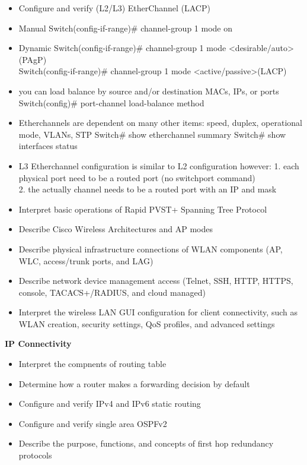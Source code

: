 \documentclass{article}
\begin{document}
\begin{itemize}
  \item Configure and verify (L2/L3) EtherChannel (LACP)
	\item[] Manual
		Switch(config-if-range)\# channel-group 1 mode on
	\item[] Dynamic
		Switch(config-if-range)\# channel-group 1 mode \textless desirable/auto\textgreater (PAgP)\\
		Switch(config-if-range)\# channel-group 1 mode \textless active/passive\textgreater (LACP)
	\item[] you can load balance by source and/or destination MACs, IPs, or ports
		Switch(config)\# port-channel load-balance method 
	\item[] Etherchannels are dependent on many other items: speed, duplex, operational mode, VLANs, STP
		Switch\# show etherchannel summary
		Switch\# show interfaces status
	\item[] L3 Etherchannel configuration is similar to L2 configuration however:
		1. each physical port need to be a routed port (no switchport command)\\
		2. the actually channel needs to be a routed port with an IP and mask\\
  \item Interpret basic operations of Rapid PVST+ Spanning Tree Protocol
  \item Describe Cisco Wireless Architectures and AP modes
  \item Describe physical infrastructure connections of WLAN components (AP, WLC, access/trunk ports, and LAG)
  \item Describe network device management access (Telnet, SSH, HTTP, HTTPS, console, TACACS+/RADIUS, and cloud managed)
  \item Interpret the wireless LAN GUI configuration for client connectivity, such as WLAN creation, security settings, QoS profiles, and advanced settings\\
\end{itemize}



\begin{flushleft}\textbf{IP Connectivity}\end{flushleft}
\begin{itemize}
  \item Interpret the compnents of routing table
  \item Determine how a router makes a forwarding decision by default
  \item Configure and verify IPv4 and IPv6 static routing 
  \item Configure and verify single area OSPFv2
  \item Describe the purpose, functions, and concepts of first hop redundancy protocols\\
\end{itemize}
\end{document}
